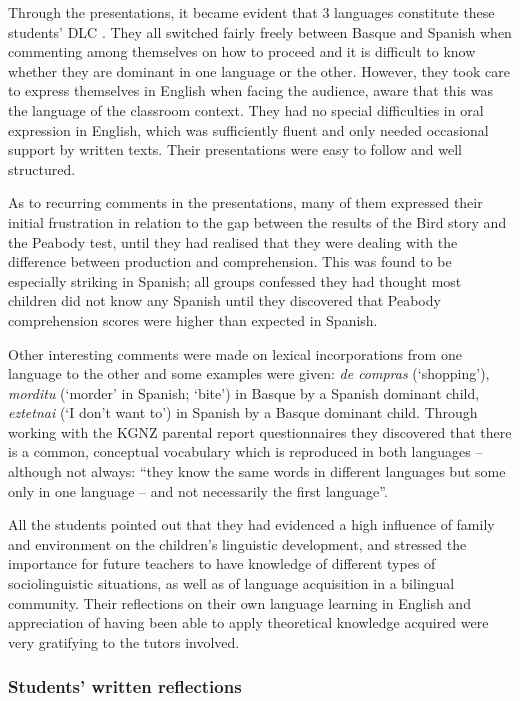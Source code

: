 \documentclass[output=paper]{../langscibook}
\begin{document}
Through the presentations, it became evident that 3 languages constitute these students’ DLC \citep{Aronin2016}. They all switched fairly freely between Basque and Spanish when commenting among themselves on how to proceed and it is difficult to know whether they are dominant in one language or the other. However, they took care to express themselves in English when facing the audience, aware that this was the language of the classroom context. They had no special difficulties in oral expression in English, which was sufficiently fluent and only needed occasional support by written texts. Their presentations were easy to follow and well structured.

As to recurring comments in the presentations, many of them expressed their initial frustration in relation to the gap between the results of the Bird story and the Peabody test, until they had realised that they were dealing with the difference between production and comprehension. This was found to be especially striking in Spanish; all groups confessed they had thought most children did not know any Spanish until they discovered that Peabody comprehension scores were higher than expected in Spanish.

Other interesting comments were made on lexical incorporations from one language to the other and some examples were given: \textit{de compras} (`shopping'), \textit{morditu} (`morder' in Spanish; `bite') in Basque by a Spanish dominant child, \textit{eztetnai} (`I don’t want to') in Spanish by a Basque dominant child. Through working with the KGNZ parental report questionnaires they discovered that there is a common, conceptual vocabulary which is reproduced in both languages – although not always: “they know the same words in different languages but some only in one language – and not necessarily the first language”.

All the students pointed out that they had evidenced a high influence of family and environment on the children’s linguistic development, and stressed the importance for future teachers to have knowledge of different types of sociolinguistic situations, as well as of language acquisition in a bilingual community. Their reflections on their own language learning in English and appreciation of having been able to apply theoretical knowledge acquired were very gratifying to the tutors involved.  


\subsubsection{Students’ written reflections}
\end{document}
